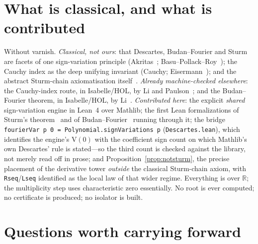 \documentclass[11pt]{article}
\newcommand{\lean}[1]{\texttt{#1}}
\newcommand{\R}{\mathbb{R}}
\newcommand{\V}{\mathrm{V}}
\begin{document}
\section{What is classical, and what is contributed}\label{sec:ours}

Without varnish. \emph{Classical, not ours}: that Descartes, Budan--Fourier and Sturm are facets of one
sign-variation principle (Akritas~\cite{akritas}; Basu--Pollack--Roy~\cite{bpr}); the Cauchy index as the
deep unifying invariant (Cauchy; Eisermann~\cite{eisermann}); and the abstract Sturm-chain axiomatisation
itself~\cite{eisermann}. \emph{Already machine-checked elsewhere}: the Cauchy-index route, in
Isabelle/HOL, by Li and Paulson~\cite{liCauchy}; and the Budan--Fourier theorem, in Isabelle/HOL, by
Li~\cite{liBF}. \emph{Contributed here}: the explicit \emph{shared} sign-variation engine in Lean~4 over
Mathlib; the first Lean formalizations of Sturm's theorem~\cite{sturmlean} and of Budan--Fourier~\cite{budanlean}
running through it; the bridge \lean{fourierVar p 0 = Polynomial.signVariations p}
(\lean{Descartes.lean}), which identifies the engine's $\V(0)$ with the coefficient sign count on which
Mathlib's own Descartes' rule is stated---so the third count is checked against the library, not merely
read off in prose; and Proposition~\ref{prop:notsturm}, the precise placement of the derivative tower
\emph{outside} the classical Sturm-chain axiom, with \lean{Rseq}/\lean{Lseq} identified as the local law
of that wider regime. Everything is over $\R$; the multiplicity step uses characteristic zero
essentially. No root is ever computed; no certificate is produced; no isolator is built.

\section{Questions worth carrying forward}\label{sec:open}
\end{document}
